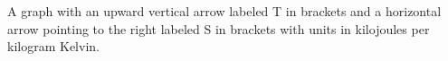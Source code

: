 A graph with an upward vertical arrow labeled T in brackets and a horizontal arrow pointing to the right labeled S in brackets with units in kilojoules per kilogram Kelvin.